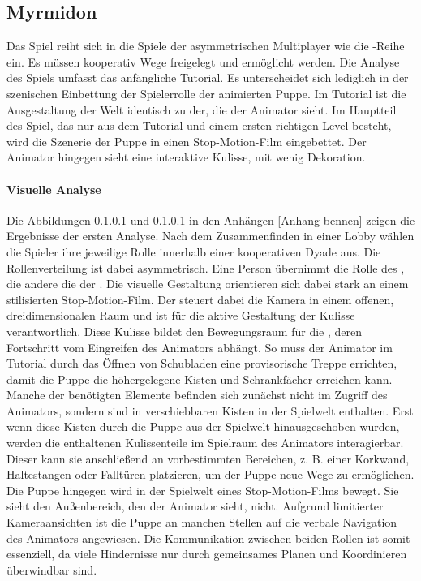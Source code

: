 \subsection{Myrmidon}
Das Spiel  reiht sich in die Spiele der asymmetrischen Multiplayer wie die -Reihe ein. Es müssen kooperativ Wege freigelegt und ermöglicht werden. Die Analyse des Spiels umfasst das anfängliche Tutorial. Es unterscheidet sich lediglich in der szenischen Einbettung der Spielerrolle der animierten Puppe. Im Tutorial ist die Ausgestaltung der Welt identisch zu der, die der Animator sieht. Im Hauptteil des Spiel, das nur aus dem Tutorial und einem ersten richtigen Level besteht, wird die Szenerie der Puppe in einen Stop-Motion-Film eingebettet. Der Animator hingegen sieht eine interaktive Kulisse, mit wenig Dekoration.

\paragraph{Visuelle Analyse}
Die Abbildungen \ref{} und \ref{} in den Anhängen [Anhang bennen] zeigen die Ergebnisse der ersten Analyse. Nach dem Zusammenfinden in einer Lobby wählen die Spieler ihre jeweilige Rolle innerhalb einer kooperativen Dyade aus. Die Rollenverteilung ist dabei asymmetrisch. Eine Person übernimmt die Rolle des , die andere die der . Die visuelle Gestaltung orientieren sich dabei stark an einem stilisierten Stop-Motion-Film. 
Der  steuert dabei die Kamera in einem offenen, dreidimensionalen Raum und ist für die aktive Gestaltung der Kulisse verantwortlich. Diese Kulisse bildet den Bewegungsraum für die , deren Fortschritt vom Eingreifen des Animators abhängt. So muss der Animator im Tutorial durch das Öffnen von Schubladen eine provisorische Treppe errichten, damit die Puppe die höhergelegene Kisten und Schrankfächer erreichen kann. 
Manche der benötigten Elemente befinden sich zunächst nicht im Zugriff des Animators, sondern sind in verschiebbaren Kisten in der Spielwelt enthalten. Erst wenn diese Kisten durch die Puppe aus der Spielwelt hinausgeschoben wurden,  werden die enthaltenen Kulissenteile im Spielraum des Animators interagierbar. Dieser kann sie anschließend an vorbestimmten Bereichen, z. B. einer Korkwand, Haltestangen oder Falltüren platzieren, um der Puppe neue Wege zu ermöglichen.
Die Puppe hingegen wird in der Spielwelt eines Stop-Motion-Films bewegt. Sie sieht den Außenbereich, den der Animator sieht, nicht. Aufgrund limitierter Kameraansichten ist die Puppe an manchen Stellen auf die verbale Navigation des Animators angewiesen. Die Kommunikation zwischen beiden Rollen ist somit essenziell, da viele Hindernisse nur durch gemeinsames Planen und Koordinieren überwindbar sind.

